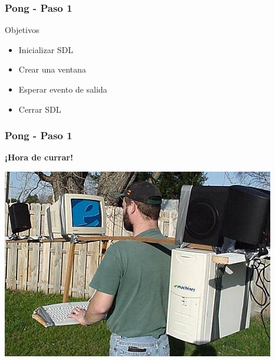 \begin{frame}
	\frametitle{Pong - Paso 1}
	
	\begin{block}{Objetivos}
		\begin{itemize}
			\item Inicializar SDL
			\item Crear una ventana
			\item Esperar evento de salida
			\item Cerrar SDL
		\end{itemize}            
	\end{block}

\end{frame}

\begin{frame}
	\frametitle{Pong - Paso 1}
	
    \begin{center}
        \textbf{¡Hora de currar!}
    \end{center}
	
    \begin{center}
		\includegraphics[scale=0.4]{img/currar-1.jpg}
    \end{center}	

\end{frame}

